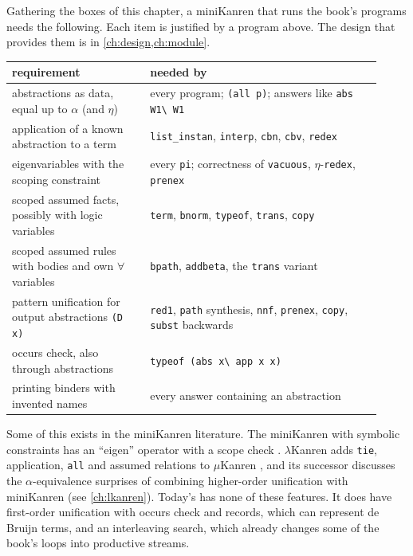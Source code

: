 {{{{{{\begin{kanren}
Gathering the boxes of this chapter, a miniKanren that runs the book's programs needs the following. Each item is
justified by a program above. The design that provides them is in \cref{ch:design,ch:module}.
\begin{center}
\small
\begin{tabular}{@{}>{\raggedright\arraybackslash}p{0.34\linewidth}>{\raggedright\arraybackslash}p{0.58\linewidth}@{}}
\toprule
requirement & needed by \\
\midrule
abstractions as data, equal up to $\alpha$ (and $\eta$) & every program; \texttt{(all p)}; answers like \texttt{abs W1\textbackslash\ W1} \\
application of a known abstraction to a term & \texttt{list\_instan}, \texttt{interp}, \texttt{cbn}, \texttt{cbv}, \texttt{redex} \\
eigenvariables with the scoping constraint & every \texttt{pi}; correctness of \texttt{vacuous}, $\eta$-\texttt{redex}, \texttt{prenex} \\
scoped assumed facts, possibly with logic variables & \texttt{term}, \texttt{bnorm}, \texttt{typeof}, \texttt{trans}, \texttt{copy} \\
scoped assumed rules with bodies and own $\forall$ variables & \texttt{bpath}, \texttt{addbeta}, the \texttt{trans} variant \\
pattern unification for output abstractions \texttt{(D x)} & \texttt{red1}, \texttt{path} synthesis, \texttt{nnf}, \texttt{prenex}, \texttt{copy}, \texttt{subst} backwards \\
occurs check, also through abstractions & \texttt{typeof (abs x\textbackslash\ app x x)} \\
printing binders with invented names & every answer containing an abstraction \\
\bottomrule
\end{tabular}
\end{center}
Some of this exists in the miniKanren literature. The miniKanren with symbolic constraints has an
\enquote{eigen} operator with a scope check \cite{HemannByrdFriedman2013}. $\lambda$Kanren adds \texttt{tie},
application, \texttt{all} and assumed relations to $\mu$Kanren \cite{MaLuFriedman2020}, and its successor
discusses the $\alpha$-equivalence surprises of combining higher-order unification with miniKanren
\cite{MaFriedman2021} (see \cref{ch:lkanren}). Today's \micro{} has none of these features. It does have
first-order unification with occurs check and records, which can represent de Bruijn terms, and an interleaving
search, which already changes some of the book's loops into productive streams.
\end{kanren}

}}}}}}
